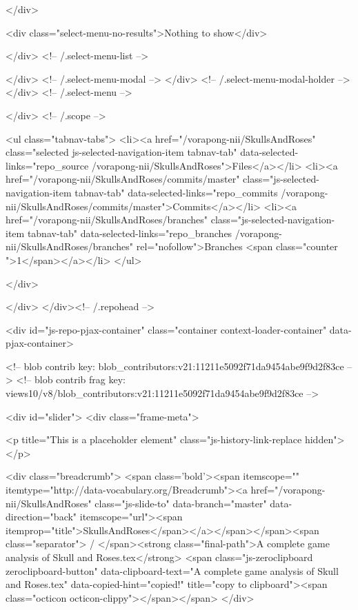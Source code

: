             </div>

            <div class="select-menu-no-results">Nothing to show</div>

          </div> <!-- /.select-menu-list -->

        </div> <!-- /.select-menu-modal -->
      </div> <!-- /.select-menu-modal-holder -->
    </div> <!-- /.select-menu -->

  </div> <!-- /.scope -->

  <ul class="tabnav-tabs">
    <li><a href="/vorapong-nii/SkullsAndRoses" class="selected js-selected-navigation-item tabnav-tab" data-selected-links="repo_source /vorapong-nii/SkullsAndRoses">Files</a></li>
    <li><a href="/vorapong-nii/SkullsAndRoses/commits/master" class="js-selected-navigation-item tabnav-tab" data-selected-links="repo_commits /vorapong-nii/SkullsAndRoses/commits/master">Commits</a></li>
    <li><a href="/vorapong-nii/SkullsAndRoses/branches" class="js-selected-navigation-item tabnav-tab" data-selected-links="repo_branches /vorapong-nii/SkullsAndRoses/branches" rel="nofollow">Branches <span class="counter ">1</span></a></li>
  </ul>

</div>

  
  
  


            
          </div>
        </div><!-- /.repohead -->

        <div id="js-repo-pjax-container" class="container context-loader-container" data-pjax-container>
          


<!-- blob contrib key: blob_contributors:v21:11211e5092f71da9454abe9f9d2f83ce -->
<!-- blob contrib frag key: views10/v8/blob_contributors:v21:11211e5092f71da9454abe9f9d2f83ce -->


<div id="slider">
    <div class="frame-meta">

      <p title="This is a placeholder element" class="js-history-link-replace hidden"></p>

        <div class="breadcrumb">
          <span class='bold'><span itemscope="" itemtype="http://data-vocabulary.org/Breadcrumb"><a href="/vorapong-nii/SkullsAndRoses" class="js-slide-to" data-branch="master" data-direction="back" itemscope="url"><span itemprop="title">SkullsAndRoses</span></a></span></span><span class="separator"> / </span><strong class="final-path">A complete game analysis of Skull and Roses.tex</strong> <span class="js-zeroclipboard zeroclipboard-button" data-clipboard-text="A complete game analysis of Skull and Roses.tex" data-copied-hint="copied!" title="copy to clipboard"><span class="octicon octicon-clippy"></span></span>
        </div>

